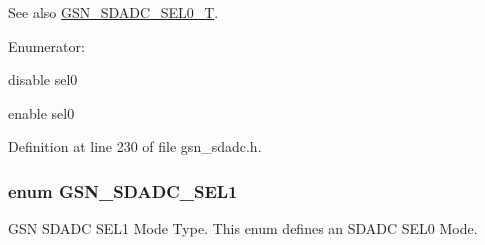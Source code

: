 \begin{DoxySeeAlso}{See also}
\hyperlink{a00652_ga1211f3eac3c8c6697324a356da4dbcb7}{GSN\_\-SDADC\_\-SEL0\_\-T}. 
\end{DoxySeeAlso}
\begin{Desc}
\item[Enumerator: ]\par
\begin{description}
\item[{\em 
\hypertarget{a00652_gga033785abce307d457533dfa53b59d84ba006fec0175e4c4c1bbcde3cd74bb0161}{
GSN\_\-SDADC\_\-SEL0\_\-DISABLE}
\label{a00652_gga033785abce307d457533dfa53b59d84ba006fec0175e4c4c1bbcde3cd74bb0161}
}]disable sel0 \item[{\em 
\hypertarget{a00652_gga033785abce307d457533dfa53b59d84bac95845a9bd57c4289957cb48b8c28373}{
GSN\_\-SDADC\_\-SEL0\_\-ENABLE}
\label{a00652_gga033785abce307d457533dfa53b59d84bac95845a9bd57c4289957cb48b8c28373}
}]enable sel0 \end{description}
\end{Desc}



Definition at line 230 of file gsn\_\-sdadc.h.

\hypertarget{a00652_ga7881f6f750388de2816384904fafac2a}{
\subsubsection[{GSN\_\-SDADC\_\-SEL1}]{\setlength{\rightskip}{0pt plus 5cm}enum {\bf GSN\_\-SDADC\_\-SEL1}}}
\label{a00652_ga7881f6f750388de2816384904fafac2a}


GSN SDADC SEL1 Mode Type. This enum defines an SDADC SEL0 Mode. 

